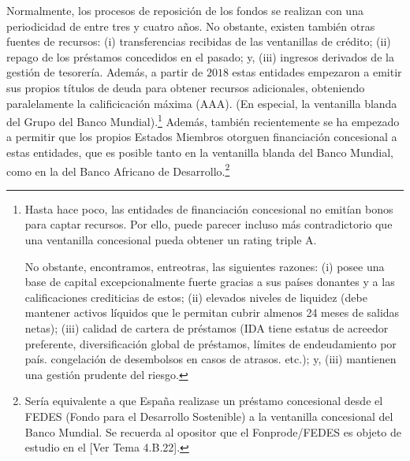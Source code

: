 \documentclass[10pt,a4paper]{article}
\newcommand{\authorfont}[1]{{\fontfamily{EBGaramond-TLF}\selectfont #1}}
\begin{document}
Normalmente, los procesos de reposición de los fondos se realizan con una periodicidad de entre tres y cuatro años. No obstante, existen también otras fuentes de recursos: (i) transferencias recibidas de las ventanillas de crédito; (ii) repago de los préstamos concedidos en el pasado; y, (iii) ingresos derivados de la gestión de tesorería. Además, a partir de $2018$ estas entidades empezaron a emitir sus propios títulos de deuda para obtener recursos adicionales, obteniendo paralelamente la calificicación máxima (AAA). (En especial, la ventanilla blanda del Grupo del Banco Mundial).\footnote{%
    Hasta hace poco, las entidades de financiación concesional no emitían bonos para captar recursos. Por ello, puede parecer incluso más contradictorio que una ventanilla concesional pueda obtener un rating triple A. 

No obstante, encontramos, entreotras, las siguientes razones: (i) posee una base de capital excepcionalmente fuerte gracias a sus países donantes y a las calificaciones crediticias de estos; (ii) elevados niveles de liquidez (debe mantener activos líquidos que le permitan cubrir almenos 24 meses de salidas netas); (iii) calidad de cartera de préstamos (IDA tiene estatus de acreedor preferente, diversificación global de préstamos, límites de endeudamiento por país. congelación de desembolsos en casos de atrasos. etc.); y, (iii) mantienen una gestión prudente del riesgo.
} Además, también recientemente se ha empezado a permitir que los propios Estados Miembros otorguen financiación concesional a estas entidades, que es posible tanto en la ventanilla blanda del Banco Mundial, como en la del Banco Africano de Desarrollo.\footnote{%
    Sería equivalente a que España realizase un préstamo concesional desde el FEDES (Fondo para el Desarrollo Sostenible) a la ventanilla concesional del Banco Mundial. Se recuerda al opositor que el Fonprode/FEDES es objeto de estudio en el [\authorfont{Ver Tema 4.B.22}].
}
\end{document}
